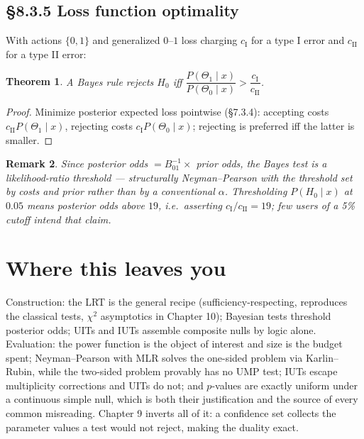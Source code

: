 \documentclass[11pt]{article}
\newtheorem{theorem}{Theorem}[section]
\newtheorem{remark}[theorem]{Remark}
\begin{document}
\subsection{\S8.3.5 Loss function optimality}
With actions $\{0,1\}$ and generalized $0$--$1$ loss charging $c_{\mathrm I}$ for a type I error and $c_{\mathrm{II}}$ for a type II error:
\begin{theorem}
A Bayes rule rejects $H_0$ iff $\dfrac{P(\Theta_1\mid x)}{P(\Theta_0\mid x)}>\dfrac{c_{\mathrm I}}{c_{\mathrm{II}}}$.
\end{theorem}
\begin{proof}
Minimize posterior expected loss pointwise (\S7.3.4): accepting costs $c_{\mathrm{II}}P(\Theta_1\mid x)$, rejecting costs $c_{\mathrm I}P(\Theta_0\mid x)$; rejecting is preferred iff the latter is smaller.
\end{proof}
\begin{remark}
Since posterior odds $=B_{01}^{-1}\times$ prior odds, the Bayes test is a likelihood-ratio threshold --- structurally Neyman--Pearson with the threshold set by costs and prior rather than by a conventional $\alpha$. Thresholding $P(H_0\mid x)$ at $0.05$ means posterior odds above $19$, i.e.\ asserting $c_{\mathrm I}/c_{\mathrm{II}}=19$; few users of a 5\% cutoff intend that claim.
\end{remark}

\section*{Where this leaves you}
Construction: the LRT is the general recipe (sufficiency-respecting, reproduces the classical tests, $\chi^2$ asymptotics in Chapter 10); Bayesian tests threshold posterior odds; UITs and IUTs assemble composite nulls by logic alone. Evaluation: the power function is the object of interest and size is the budget spent; Neyman--Pearson with MLR solves the one-sided problem via Karlin--Rubin, while the two-sided problem provably has no UMP test; IUTs escape multiplicity corrections and UITs do not; and $p$-values are exactly uniform under a continuous simple null, which is both their justification and the source of every common misreading. Chapter 9 inverts all of it: a confidence set collects the parameter values a test would not reject, making the duality exact.
\end{document}
